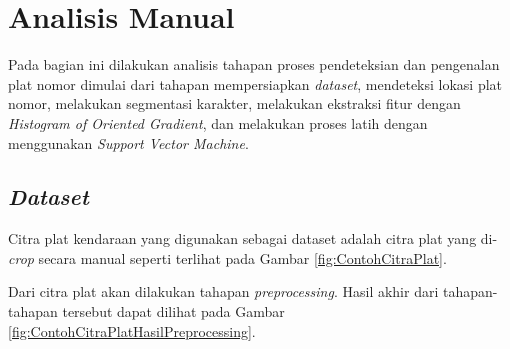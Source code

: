 \section{Analisis Manual}
\noindent Pada bagian ini dilakukan analisis tahapan proses pendeteksian dan pengenalan plat nomor dimulai dari tahapan mempersiapkan \textit{dataset}, mendeteksi lokasi plat nomor, melakukan segmentasi karakter, melakukan ekstraksi fitur dengan \textit{Histogram of Oriented Gradient}, dan melakukan proses latih dengan menggunakan \textit{Support Vector Machine}.
\subsection{\textit{Dataset}}
\noindent Citra plat kendaraan yang digunakan sebagai dataset adalah citra plat yang di-\textit{crop} secara manual seperti terlihat pada Gambar \ref{fig:ContohCitraPlat}.

\begin{adjustbox}{width=1\textwidth}
	\noindent
	\begin{minipage}{\linewidth}
		\label{fig:ContohCitraPlat}
	\end{minipage}
\end{adjustbox}

\noindent Dari citra plat akan dilakukan tahapan \textit{preprocessing}. Hasil akhir dari tahapan-tahapan tersebut dapat dilihat pada Gambar \ref{fig:ContohCitraPlatHasilPreprocessing}.

\begin{adjustbox}{width=1\textwidth}
	\noindent\begin{minipage}{\linewidth}
		\label{fig:ContohCitraPlatHasilPreprocessing}
	\end{minipage}
\end{adjustbox}

